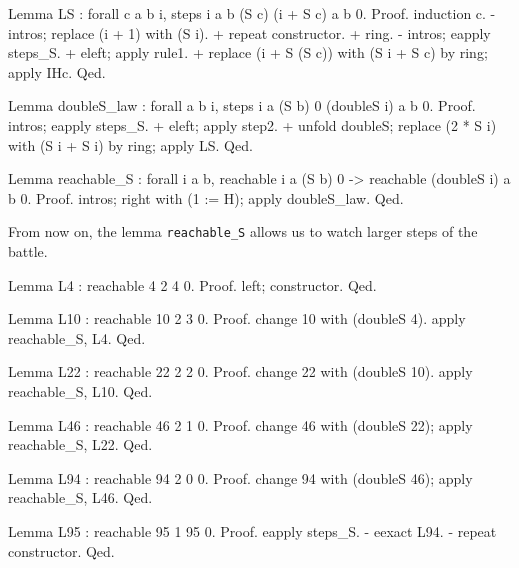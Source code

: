 \begin{Coqsrc}
Lemma LS : forall c a b i,  steps i a b (S c) (i + S c) a b 0.
Proof.
  induction c.
 -   intros;  replace (i + 1) with (S i).
     + repeat constructor.
     + ring.
 -  intros; eapply  steps_S.
   +   eleft;   apply rule1.
   +   replace (i + S (S c)) with (S i + S c) by ring;  apply IHc.
Qed.
\end{Coqsrc}

\begin{Coqsrc}
Lemma doubleS_law : forall  a b i, steps i a (S b) 0 (doubleS i) a b 0.
Proof.
  intros;  eapply steps_S.
  +   eleft;   apply step2.
  +   unfold doubleS; replace (2 * S i) with (S i + S i) by ring; 
        apply LS.
Qed.
\end{Coqsrc}


\begin{Coqsrc}
Lemma reachable_S  : forall i a b, reachable i a (S b) 0 ->
                                   reachable (doubleS i) a b 0.
Proof.
  intros; right with  (1 := H); apply doubleS_law.
Qed.
\end{Coqsrc}

From now on, the lemma \texttt{reachable\_S} allows us to watch larger steps of 
the battle.


\begin{Coqsrc}
 Lemma L4 : reachable 4 2 4 0.
Proof.
  left; constructor.
Qed.
\end{Coqsrc}

\begin{Coqsrc}
Lemma L10 : reachable 10 2 3 0.
Proof.
  change 10 with (doubleS 4).
  apply reachable_S, L4.
Qed.
\end{Coqsrc}

\begin{Coqsrc}
Lemma L22 : reachable 22 2 2 0.
Proof.
  change 22 with (doubleS 10).
  apply reachable_S, L10.
Qed.
\end{Coqsrc}

\begin{Coqsrc}
Lemma L46 : reachable 46 2 1 0.
Proof.
  change 46 with (doubleS 22); apply  reachable_S, L22.
Qed.
\end{Coqsrc}

\begin{Coqsrc}
Lemma L94 : reachable 94 2 0 0.
Proof.
  change 94 with (doubleS 46); apply reachable_S, L46.
Qed.
\end{Coqsrc}

\begin{Coqsrc}
Lemma L95 : reachable 95 1 95 0.
Proof.
  eapply steps_S.
  -  eexact L94.
  -  repeat constructor.
Qed.
\end{Coqsrc}

